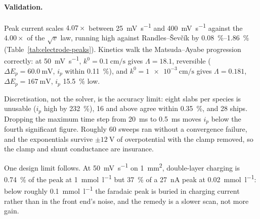 
\paragraph{Validation.} Peak current scales \(4.07\times\) between
\SI{25}{\milli\volt\per\second} and \SI{400}{\milli\volt\per\second} against the
\(4.00\times\) of the \(\sqrt{v}\) law, running high against
Randles--\v{S}ev\v{c}\'ik by \SIrange{0.08}{1.86}{\percent}
(Table~\ref{tab:electrode-peaks}). Kinetics walk the Matsuda--Ayabe progression
correctly: at \SI{50}{\milli\volt\per\second},
\(k^0 = \SI{0.1}{\centi\metre\per\second}\) gives \(\Lambda = 18.1\), reversible
(\(\Delta E_p = \SI{60.0}{\milli\volt}\), \(i_p\) within \SI{0.11}{\percent}),
and \(k^0 = \SI{1e-3}{\centi\metre\per\second}\) gives \(\Lambda = 0.181\),
\(\Delta E_p = \SI{167}{\milli\volt}\), \(i_p\) \SI{15.5}{\percent} low.

Discretisation, not the solver, is the accuracy limit: eight slabs per species
is unusable (\(i_p\) high by \SI{232}{\percent}), 16 and above agree within
\SI{0.35}{\percent}, and 28 ships. Dropping the maximum time step from
\SI{20}{\milli\second} to \SI{0.5}{\milli\second} moves \(i_p\) below the fourth
significant figure. Roughly \num{60} sweeps ran without a convergence failure,
and the exponentials survive \(\pm\SI{12}{\volt}\) of overpotential with the
clamp removed, so the clamp and shunt conductance are insurance.

One design limit follows. At \SI{50}{\milli\volt\per\second} on
\SI{1}{\square\milli\metre}, double-layer charging is \SI{0.74}{\percent} of the
peak at \SI{1}{\milli\mole\per\litre} but \SI{37}{\percent} of a
\SI{27}{\nano\ampere} peak at \SI{0.02}{\milli\mole\per\litre}: below roughly
\SI{0.1}{\milli\mole\per\litre} the faradaic peak is buried in charging current
rather than in the front end's noise, and the remedy is a slower scan, not more
gain.
